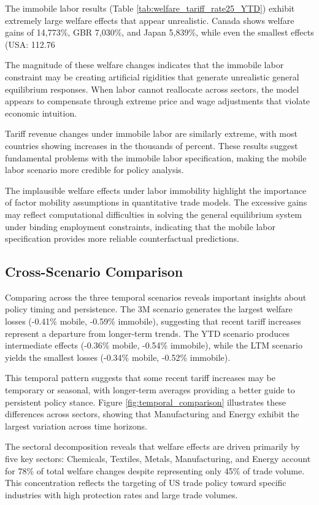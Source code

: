The immobile labor results (Table \ref{tab:welfare_tariff_rate25_YTD}) exhibit extremely large welfare effects that appear unrealistic. Canada shows welfare gains of 14,773\%, GBR 7,030\%, and Japan 5,839\%, while even the smallest effects (USA: 112.76%

The magnitude of these welfare changes indicates that the immobile labor constraint may be creating artificial rigidities that generate unrealistic general equilibrium responses. When labor cannot reallocate across sectors, the model appears to compensate through extreme price and wage adjustments that violate economic intuition.

Tariff revenue changes under immobile labor are similarly extreme, with most countries showing increases in the thousands of percent. These results suggest fundamental problems with the immobile labor specification, making the mobile labor scenario more credible for policy analysis.

The implausible welfare effects under labor immobility highlight the importance of factor mobility assumptions in quantitative trade models. The excessive gains may reflect computational difficulties in solving the general equilibrium system under binding employment constraints, indicating that the mobile labor specification provides more reliable counterfactual predictions.

\subsection{Cross-Scenario Comparison}

Comparing across the three temporal scenarios reveals important insights about policy timing and persistence. The 3M scenario generates the largest welfare losses (-0.41\% mobile, -0.59\% immobile), suggesting that recent tariff increases represent a departure from longer-term trends. The YTD scenario produces intermediate effects (-0.36\% mobile, -0.54\% immobile), while the LTM scenario yields the smallest losses (-0.34\% mobile, -0.52\% immobile).

This temporal pattern suggests that some recent tariff increases may be temporary or seasonal, with longer-term averages providing a better guide to persistent policy stance. Figure \ref{fig:temporal_comparison} illustrates these differences across sectors, showing that Manufacturing and Energy exhibit the largest variation across time horizons.

The sectoral decomposition reveals that welfare effects are driven primarily by five key sectors: Chemicals, Textiles, Metals, Manufacturing, and Energy account for 78\% of total welfare changes despite representing only 45\% of trade volume. This concentration reflects the targeting of US trade policy toward specific industries with high protection rates and large trade volumes.
